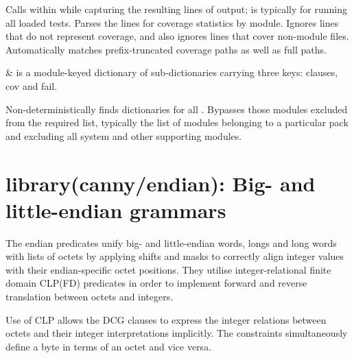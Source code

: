 \begin{description}
Calls  within  while capturing the resulting
lines of output;  is typically  for running all
loaded tests. Parses the lines for coverage statistics by module.
Ignores lines that do not represent coverage, and also ignores lines
that cover non-module files. Automatically matches prefix-truncated
coverage paths as well as full paths.

\begin{arguments}
 & is a module-keyed dictionary of sub-dictionaries
carrying three keys: clauses, cov and fail. \\
\end{arguments}

Non-deterministically finds  dictionaries for all .
Bypasses those modules excluded from the required list, typically
the list of modules belonging to a particular pack and excluding all
system and other supporting modules.
\end{description}

\chapter{library(canny/endian): Big- and little-endian grammars}\label{sec:endian}

The endian predicates unify big- and little-endian words, longs and
long words with lists of octets by applying shifts and masks to
correctly align integer values with their endian-specific octet
positions. They utilise integer-relational finite domain CLP(FD)
predicates in order to implement forward and reverse translation
between octets and integers.

Use of CLP allows the DCG clauses to express the integer relations
between octets and their integer interpretations implicitly. The
constraints simultaneously define a byte in terms of an octet and
vice versa.\vspace{0.7cm}

